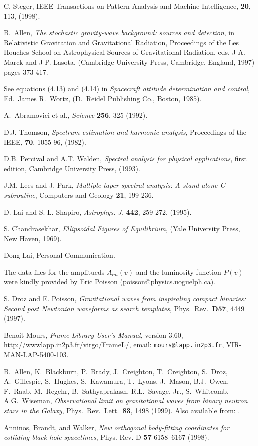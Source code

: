 \documentclass[11pt]{article}
\begin{document}
\begin{thebibliography}{99}
 C. Steger, IEEE Transactions on Pattern Analysis
and Machine Intelligence, {\bf 20}, 113, (1998).

B.~Allen, {\it The stochastic gravity-wave background: sources and
detection}, in Relativistic Gravitation and Gravitational Radiation,
Proceedings of the Les Houches School on Astrophysical
Sources of Gravitational Radiation, eds. J-A. Marck and J-P. Lasota,
(Cambridge University Press, Cambridge, England, 1997) pages 373-417.

See equations (4.13) and (4.14) in
{\it Spacecraft attitude determination and control}, 
Ed.~James R.~Wortz,
(D.~Reidel Publishing Co., Boston, 1985).

A.~Abramovici et al., 
{\it Science} {\bf 256}, 325 (1992). 

D.J. Thomson, {\it Spectrum estimation and harmonic analysis}, 
Proceedings of the IEEE, {\bf 70}, 1055-96, (1982).

D.B. Percival and A.T. Walden, {\it Spectral analysis for physical applications}, first edition, Cambridge University Press, (1993).

J.M. Lees and J. Park, {\it Multiple-taper spectral analysis: A stand-alone C
subroutine}, Computers and Geology {\bf 21}, 199-236.

D. Lai and S. L. Shapiro, {\it Astrophys. J.} {\bf 442}, 259-272, (1995).

S. Chandrasekhar, {\it Ellipsoidal Figures of Equilibrium}, (Yale University
Press, New Haven, 1969).

Dong Lai, Personal Communication.

 The data files for the amplitueds $A_{lm}(v)$ and the
luminosity function $P(v)$ were kindly provided by Eric Poisson
(poisson@physics.uoguelph.ca). 

 S. Droz and E. Poisson, {\it Gravitational waves from
inspiraling compact binaries: Second post Newtonian waveforms as search
templates}, Phys.\ Rev.\  {\bf D57}, 4449 (1997).

 Benoit Mours, {\it Frame Library User's Manual},
version 3.60, 
{http://wwwlapp.in2p3.fr/virgo/FrameL/}, email: {\tt mours@lapp.in2p3.fr},
VIR-MAN-LAP-5400-103.

B.~Allen, K.~Blackburn, P.~Brady, J.~Creighton, T.~Creighton, S.~Droz, A.~Gillespie,
S.~Hughes, S.~Kawamura, T.~Lyons, J.~Mason, B.J.~Owen, F.~Raab, M.~Regehr, B.~Sathyaprakash,
R.L.~Savage, Jr., S.~Whitcomb, A.G.~Wiseman,
{\it Observational limit on gravitational waves from binary neutron stars in the Galaxy},
Phys.\ Rev.\ Lett.\ {\bf 83}, 1498 (1999).  Also
available from:
.

Anninos, Brandt, and Walker, {\it New orthogonal body-fitting coordinates
for colliding black-hole spacetimes},  Phys. Rev. D \textbf{57}
6158--6167 (1998).

\end{thebibliography}
\end{document}
